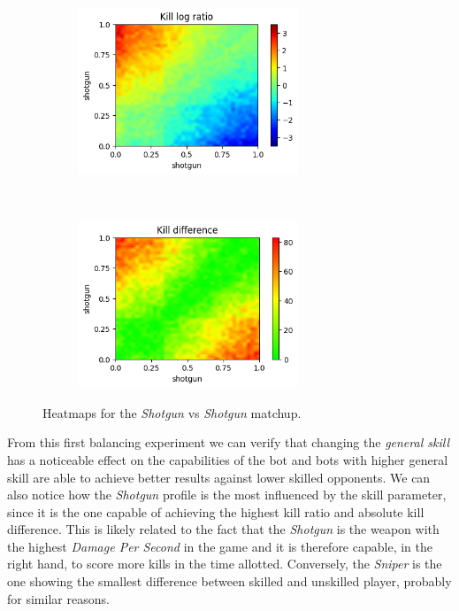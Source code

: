 \begin{figure}[H]
    \centering
    \begin{subfigure}[t]{0.5\textwidth}
        \centering
        \includegraphics[height=5cm]{Images/images/heatmaps/same-profile/shotgun_heatmap_ratio.png}
    \end{subfigure}%
    ~ 
    \begin{subfigure}[t]{0.5\textwidth}
        \centering
        \includegraphics[height=5cm]{Images/images/heatmaps/same-profile/shotgun_heatmap_diff.png}
    \end{subfigure}
    \caption{Heatmaps for the \textit{Shotgun} vs \textit{Shotgun} matchup.}
    \label{fig:balance_shotgun_shotgun}
\end{figure}

From this first balancing experiment we can verify that changing the \textit{general skill} has a noticeable effect on the capabilities of the bot and bots with higher general skill are able to achieve better results against lower skilled opponents.
We can also notice how the \textit{Shotgun} profile is the most influenced by the skill parameter, since it is the one capable of achieving the highest kill ratio and absolute kill difference. This is likely related to the fact that the \textit{Shotgun} is the weapon with the highest \textit{Damage Per Second} in the game and it is therefore capable, in the right hand, to score more kills in the time allotted. Conversely, the \textit{Sniper} is the one showing the smallest difference between skilled and unskilled player, probably for similar reasons.

